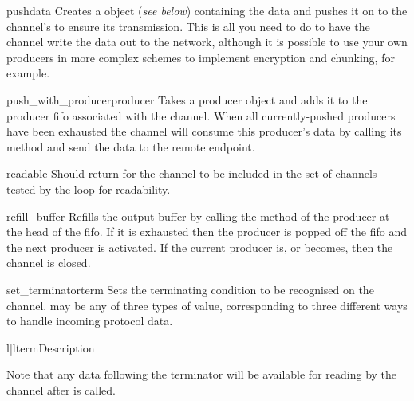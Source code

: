 \begin{methoddesc}{push}{data}
  Creates a  object (\emph{see below}) containing the data and
  pushes it on to the channel's  to ensure its
  transmission. This is all you need to do to have the channel write
  the data out to the network, although it is possible to use your
  own producers in more complex schemes to implement encryption and
  chunking, for example.
\end{methoddesc}

\begin{methoddesc}{push_with_producer}{producer}
  Takes a producer object and adds it to the producer fifo associated with
  the channel. When all currently-pushed producers have been exhausted
  the channel will consume this producer's data by calling its
   method and send the data to the remote endpoint. 
\end{methoddesc}

\begin{methoddesc}{readable}{}
  Should return  for the channel to be included in the set of
  channels tested by the  loop for readability.
\end{methoddesc}

\begin{methoddesc}{refill_buffer}{}
  Refills the output buffer by calling the  method of the
  producer at the head of the fifo. If it is exhausted then the
  producer is popped off the fifo and the next producer is activated.
  If the current producer is, or becomes,  then the channel
  is closed.
\end{methoddesc}

\begin{methoddesc}{set_terminator}{term}
  Sets the terminating condition to be recognised on the channel. 
  may be any of three types of value, corresponding to three different ways
  to handle incoming protocol data.

  \begin{tableii}{l|l}{}{term}{Description}
  \end{tableii}

  Note that any data following the terminator will be available for reading by
  the channel after  is called.
\end{methoddesc}

